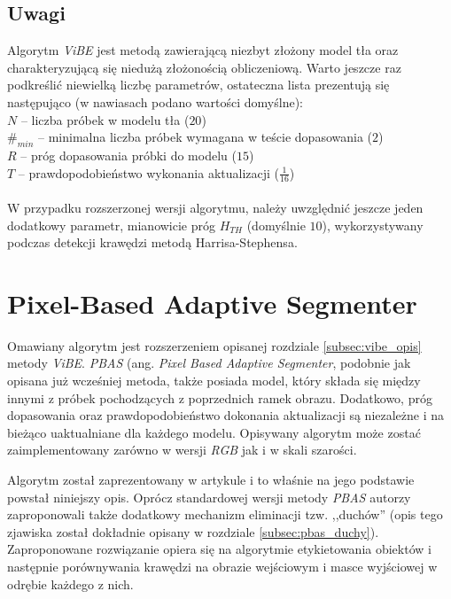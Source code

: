 \subsection{Uwagi}
\label{subsec:vibe_uwagi}

Algorytm \textit{ViBE} jest metodą zawierającą niezbyt złożony model tła oraz charakteryzującą się niedużą złożonością obliczeniową. Warto jeszcze raz podkreślić niewielką liczbę parametrów, ostateczna lista prezentują się następująco (w nawiasach podano wartości domyślne):\\
\-\hspace{1cm} $N$ -- liczba próbek w modelu tła ($20$)\\
\-\hspace{1cm} $\#_{min}$ -- minimalna liczba próbek wymagana w teście dopasowania ($2$)\\
\-\hspace{1cm} $R$ -- próg dopasowania próbki do modelu ($15$) \\
\-\hspace{1cm} $T$ -- prawdopodobieństwo wykonania aktualizacji ($\frac{1}{16}$)\\
\\
\noindent W przypadku rozszerzonej wersji algorytmu, należy uwzględnić jeszcze jeden dodatkowy parametr, mianowicie próg $H_{TH}$ (domyślnie $10$), wykorzystywany podczas detekcji krawędzi metodą Harrisa-Stephensa.
    

\section{Pixel-Based Adaptive Segmenter}
\label{sec:pbas_teoria}

Omawiany algorytm jest rozszerzeniem opisanej rozdziale \ref{subsec:vibe_opis} metody \textit{ViBE}. \textit{PBAS} (ang. \textit{Pixel Based Adaptive Segmenter}, podobnie jak opisana już wcześniej metoda, także posiada model, który składa się między innymi z próbek pochodzących z poprzednich ramek obrazu. Dodatkowo, próg dopasowania oraz prawdopodobieństwo dokonania aktualizacji są niezależne i na bieżąco uaktualniane dla każdego modelu. Opisywany algorytm może zostać zaimplementowany zarówno w wersji \textit{RGB} jak i w skali szarości.

Algorytm został zaprezentowany w artykule \cite{kryjak_14_pbas} i to właśnie na jego podstawie powstał niniejszy opis. Oprócz standardowej wersji metody \textit{PBAS} autorzy zaproponowali także dodatkowy mechanizm eliminacji tzw. ,,duchów'' (opis tego zjawiska został dokładnie opisany w rozdziale \ref{subsec:pbas_duchy}). Zaproponowane rozwiązanie opiera się na algorytmie etykietowania obiektów i następnie porównywania krawędzi na obrazie wejściowym i masce wyjściowej w odrębie każdego z nich.


